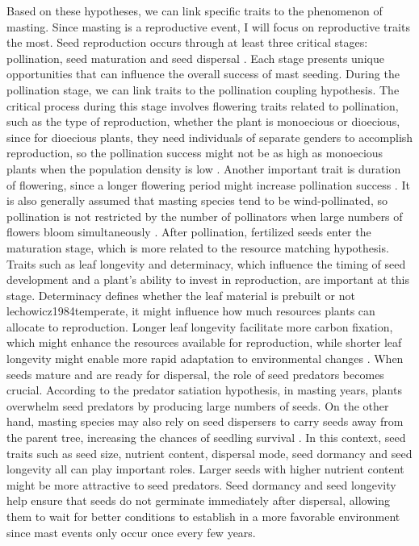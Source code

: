 \documentclass[11pt,letter]{article}
\begin{document}
Based on these hypotheses, we can link specific traits to the phenomenon of masting. Since masting is a reproductive event, I will focus on reproductive traits the most. Seed reproduction occurs through at least three critical stages: pollination, seed maturation and seed dispersal \citep{satake2021studying}. Each stage presents unique opportunities that can influence the overall success of mast seeding. During the pollination stage, we can link traits to the pollination coupling hypothesis. The critical process during this stage involves flowering traits related to pollination, such as the type of reproduction, whether the plant is monoecious or dioecious, since for dioecious plants, they need individuals of separate genders to accomplish reproduction, so the pollination success might not be as high as monoecious plants when the population density is low \citep{bawa1980evolution}. Another important trait is duration of flowering, since a longer flowering period might increase pollination success \citep{knight2005pollen}. It is also generally assumed that masting species tend to be wind-pollinated, so pollination is not restricted by the number of pollinators when large numbers of flowers bloom simultaneously \citep{bogdziewicz2017masting, bogdziewicz2020flowering}. After pollination, fertilized seeds enter the maturation stage, which is more related to the resource matching hypothesis. Traits such as leaf longevity and determinacy, which influence the timing of seed development and a plant's ability to invest in reproduction, are important at this stage. Determinacy defines whether the leaf material is prebuilt or not {lechowicz1984temperate}, it might influence how much resources plants can allocate to reproduction.  Longer leaf longevity facilitate more carbon fixation, which might enhance the resources available for reproduction, while shorter leaf longevity might enable more rapid adaptation to environmental changes \citep{adler2014functional}. When seeds mature and are ready for dispersal, the role of seed predators becomes crucial. According to the predator satiation hypothesis, in masting years, plants overwhelm seed predators by producing large numbers of seeds. On the other hand, masting species may also rely on seed dispersers to carry seeds away from the parent tree, increasing the chances of seedling survival \citep{janzen1971seed, silvertown1980evolutionary}. In this context, seed traits such as seed size, nutrient content, dispersal mode, seed dormancy and seed longevity all can play important roles. Larger seeds with higher nutrient content might be more attractive to seed predators. Seed dormancy and seed longevity help ensure that seeds do not germinate immediately after dispersal, allowing them to wait for better conditions to establish in a more favorable environment since mast events only occur once every few years.\par
\end{document}

